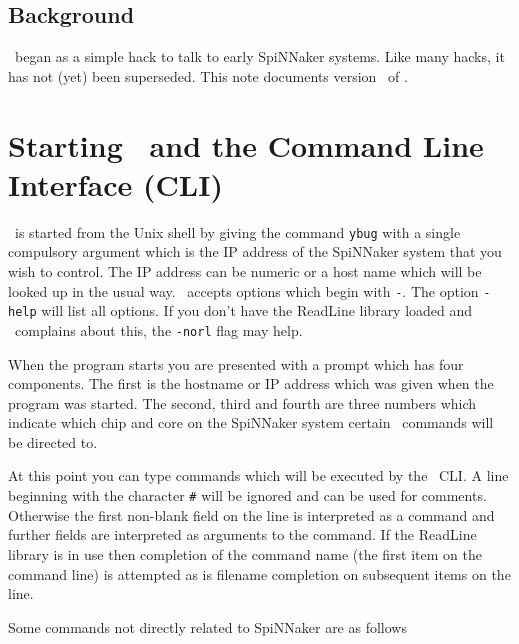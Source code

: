 \subsection{Background}

\ybug\ began as a simple hack to talk to early SpiNNaker systems. Like
many hacks, it has not (yet) been superseded. This note documents
version \Version\ of \ybug.

\section{Starting \ybug\ and the Command Line Interface (CLI)}

\ybug\ is started from the Unix shell by giving the command \texttt{ybug}
with a single compulsory argument which is the IP address of the
SpiNNaker system that you wish to control. The IP address can be
numeric or a host name which will be looked up in the usual way. \ybug\
accepts options which begin with \texttt{-}. The option \texttt{-help}
will list all options. If you don't have the ReadLine library loaded
and \ybug\ complains about this, the \texttt{-norl} flag may help.

When the program starts you are presented with a prompt which has four
components. The first is the hostname or IP address which was given
when the program was started. The second, third and fourth are three
numbers which indicate which chip and core on the SpiNNaker system
certain \ybug\ commands will be directed to.

At this point you can type commands which will be executed by
the \ybug\ CLI. A line beginning with the character \texttt{\#} will
be ignored and can be used for comments. Otherwise the first non-blank
field on the line is interpreted as a command and further fields are
interpreted as arguments to the command. If the ReadLine library is in
use then completion of the command name (the first item on the command
line) is attempted as is filename completion on subsequent items on the
line.

Some commands not directly related to SpiNNaker are as follows

